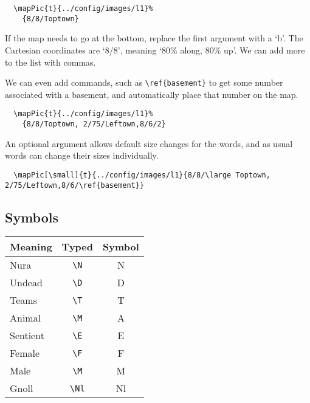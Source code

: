 \documentclass[a4paper,openany]{book}
\begin{document}
\begin{multicols}{2}
\begin{verbatim}
  \mapPic{t}{../config/images/l1}%
    {8/8/Toptown}
\end{verbatim}

If the map needs to go at the bottom, replace the first argument with a `b'.
The Cartesian coordinates are `8/8', meaning `80\% along, 80\% up'.
We can add more to the list with commas.

We can even add commands, such as \verb"\ref{basement}" to get some number associated with a basement, and automatically place that number on the map.

\begin{verbatim}
  \mapPic{t}{../config/images/l1}%
    {8/8/Toptown, 2/75/Leftown,8/6/2}
\end{verbatim}

An optional argument allows default size changes for the words, and as usual words can change their sizes individually.

\begin{verbatim}
  \mapPic[\small]{t}{../config/images/l1}{8/8/\large Toptown, 2/75/Leftown,8/6/\ref{basement}}
\end{verbatim}

\subsection{Symbols}

\begin{tabularx}{\linewidth}{Xcc}

  Meaning & Typed & Symbol \\\hline

  Nura & {\tt \textbackslash{N}} & \gls{N} \\

  Undead & {\tt \textbackslash{D}} & \gls{D} \\
  \hline
  Teams & {\tt \textbackslash{T}} & \gls{T} \\

  Animal & {\tt \textbackslash{M}} & \gls{A} \\

  Sentient & {\tt \textbackslash{E}} & \gls{E} \\

  Female & {\tt \textbackslash{F}} & \gls{F} \\

  Male & {\tt \textbackslash{M}} & \gls{M} \\

  \hline
  Gnoll & {\tt \textbackslash{Nl}} & \gls{Nl} \\


\end{tabularx}
\end{multicols}
\end{document}
